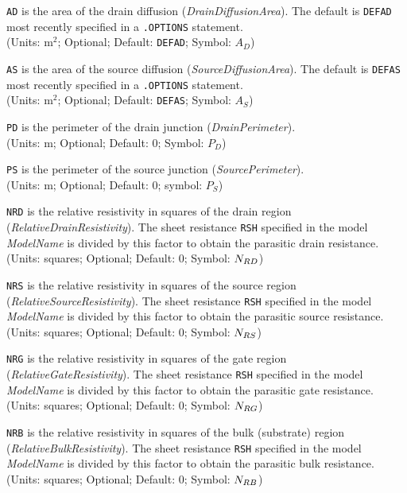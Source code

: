 \begin{widelist}
\item[{{\tt AD}}]  is the area of the drain diffusion
               ({\it DrainDiffusionArea}). The default is {\tt DEFAD}
	       most recently specified in a {\tt .OPTIONS} statement.\\
               (Units: $\mbox{m}^2$; Optional; Default: {\tt DEFAD};
	       Symbol: $A_D$)

\item[{{\tt AS}}]  is the area of the source diffusion
               ({\it SourceDiffusionArea}).  The default is {\tt DEFAS}
	       most recently specified in a {\tt .OPTIONS} statement.\\
               (Units: $\mbox{m}^2$; Optional; Default: {\tt DEFAS};
	       Symbol: $A_S$)

\item[{\tt PD}]  is the perimeter of the drain junction
               ({\it DrainPerimeter}).\\
               (Units: m; Optional; Default: 0; Symbol: $P_D$)

\item[{\tt PS}]  is the perimeter of the source junction
               ({\it SourcePerimeter}).\\
               (Units: m; Optional; Default: 0; symbol: $P_S$)

\item[{\tt NRD}]  is  the  relative resistivity in squares of the drain region
               ({\it RelativeDrainResistivity}).
               The sheet resistance {\tt RSH} specified in the model {\it
	       ModelName} is divided  by this factor to obtain the
	       parasitic drain resistance.\\
	       (Units: squares; Optional; Default: 0; Symbol: $N_{RD}$)

\item[{\tt NRS}]  is  the  relative resistivity in squares of the source region
               ({\it RelativeSourceResistivity}).
               The sheet resistance {\tt RSH} specified in the model {\it
	       ModelName} is divided  by this factor to obtain the
	       parasitic source resistance.\\
	       (Units: squares; Optional; Default: 0; Symbol: $N_{RS}$)
\item[{\tt NRG}]  is  the  relative resistivity in squares of the gate region
               ({\it RelativeGateResistivity}).
               The sheet resistance {\tt RSH} specified in the model {\it
	       ModelName} is divided  by this factor to obtain the
	       parasitic gate resistance.\\
	       (Units: squares; Optional; Default: 0; Symbol: $N_{RG}$)
\item[{\tt NRB}]  is the relative resistivity in squares of the bulk
               (substrate) region
               ({\it RelativeBulkResistivity}).
               The sheet resistance {\tt RSH} specified in the model {\it
	       ModelName} is divided  by this factor to obtain the
	       parasitic bulk resistance.\\
	       (Units: squares; Optional; Default: 0; Symbol: $N_{RB}$)
\end{widelist}

